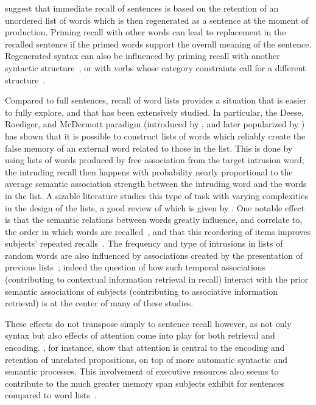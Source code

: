 \begin{new}

\citet{potter_regeneration_1990} suggest that immediate recall of sentences is based on the retention of an unordered list of words which is then regenerated as a sentence at the moment of production.
Priming recall with other words can lead to replacement in the recalled sentence if the primed words support the overall meaning of the sentence.
Regenerated syntax can also be influenced by priming recall with another syntactic structure~\citep{potter_syntactic_1998}, or with verbs whose category constraints call for a different structure~\citep{lombardi_regeneration_1992}.

Compared to full sentences, recall of word lists provides a situation that is easier to fully explore, and that has been extensively studied.
In particular, the Deese, Roediger, and McDermott paradigm (introduced by \citealp{deese_prediction_1959}, and later popularized by \citealp{roediger_creating_1995}) has shown that it is possible to construct lists of words which reliably create the false memory of an external word related to those in the list.
This is done by using lists of words produced by free association from the target intrusion word;
the intruding recall then happens with probability nearly proportional to the average semantic association strength between the intruding word and the words in the list.
A sizable literature studies this type of task with varying complexities in the design of the lists, a good review of which is given by \citet{zaromb_temporal_2006}.
One notable effect is that the semantic relations between words greatly influence, and correlate to, the order in which words are recalled~\citep{tulving_subjective_1962,howard_when_2002}, and that this reordering of items improves subjects' repeated recalls~\citep{tulving_subjective_1966}.
The frequency and type of intrusions in lists of random words are also influenced by associations created by the presentation of previous lists~\citep{zaromb_temporal_2006};
indeed the question of how such temporal associations (contributing to contextual information retrieval in recall) interact with the prior semantic associations of subjects (contributing to associative information retrieval) is at the center of many of these studies.

These effects do not transpose simply to sentence recall however, as not only syntax but also effects of attention come into play for both retrieval and encoding.
\citet{jefferies_automatic_2004}, for instance, show that attention is central to the encoding and retention of unrelated propositions, on top of more automatic syntactic and semantic processes.
This involvement of executive resources also seems to contribute to the much greater memory span subjects exhibit for sentences compared to word lists~\citep[see][again, for more details]{jefferies_automatic_2004}.

\end{new}

